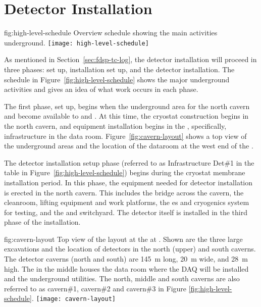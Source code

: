 \section{Detector Installation}
\label{sec:fdsp-tc-inst}



\begin{dunefigure}{fig:high-level-schedule}
  {Overview schedule showing the main activities underground.}
\texttt{[image: high-level-schedule]}
\end{dunefigure}


As mentioned in Section~\ref{sec:fdsp-tc-log}, the  detector installation will proceed in three phases:  set up, installation set up, and the detector installation. The schedule in Figure~\ref{fig:high-level-schedule} shows the major underground activities and gives an idea of what work occurs in each phase. 

The first phase,  set up, begins when the underground area for the north cavern and  become available to  and . At this time, the  cryostat construction begins in the north cavern, and  equipment installation 
begins in the , specifically, infrastructure in the  data room. Figure~\ref{fig:cavern-layout} shows a top view of the underground areas and the location of the dataroom at the west end of the . 

The detector installation setup phase (referred to as Infrastructure Det\#1 in the table in Figure~\ref{fig:high-level-schedule}) begins during the cryostat membrane installation period. 
In this phase, the equipment needed for detector installation is erected in the north cavern. This includes the bridge across the cavern, the cleanroom, lifting equipment and work platforms, the \coldbox{}es and cryogenics system for  testing, and the  and switchyard. 
The detector itself is installed in the third phase of the installation. 

\begin{dunefigure}{fig:cavern-layout}
  {Top view of the layout at the  at . Shown are the three large excavations and the location of detectors in the north (upper) and south caverns. 
The detector caverns (north and south) are \SI{145}{\meter} long, \SI{20}{\meter} wide, and  \SI{28}{\meter} high.   The  in the middle houses the  data room where the DAQ will be installed and the underground utilities. The north, middle and south caverns are also referred to as cavern\#1, cavern\#2 and cavern\#3 in Figure \ref{fig:high-level-schedule}.}
\texttt{[image: cavern-layout]}
\end{dunefigure}


